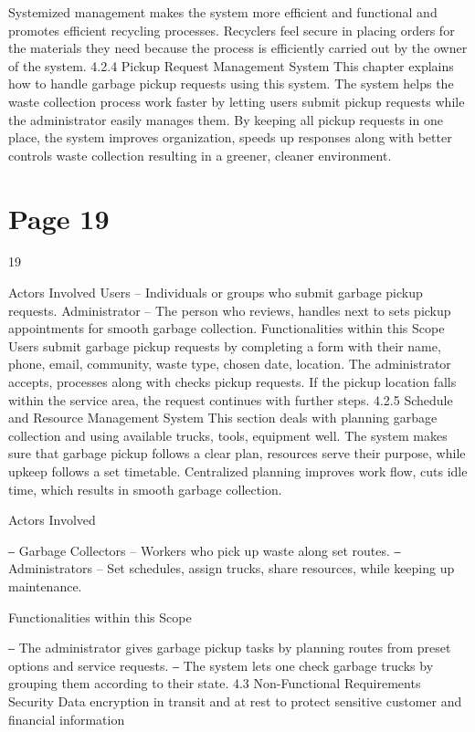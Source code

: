 \documentclass{article}
\begin{document}
Systemized management makes the system more efficient and functional and promotes 
efficient recycling processes. Recyclers feel secure in placing orders for the materials they need 
because the process is efficiently carried out by the owner of the system. 
4.2.4 Pickup Request Management System 
This chapter explains how to handle garbage pickup requests using this system. The system 
helps the waste collection process work faster by letting users submit pickup requests while the 
administrator easily manages them. By keeping all pickup requests in one place, the system 
improves organization, speeds up responses along with better controls waste collection 
resulting in a greener, cleaner environment. 
 

\section*{Page 19}
   
 
 19  
 
Actors Involved 
Users – Individuals or groups who submit garbage pickup requests. 
Administrator – The person who reviews, handles next to sets pickup appointments for smooth 
garbage collection. 
Functionalities within this Scope 
Users submit garbage pickup requests by completing a form with their name, phone, email, 
community, waste type, chosen date, location. 
The administrator accepts, processes along with checks pickup requests. 
If the pickup location falls within the service area, the request continues with further steps. 
4.2.5 Schedule and Resource Management System 
This section deals with planning garbage collection and using available trucks, tools, equipment 
well. The system makes sure that garbage pickup follows a clear plan, resources serve their 
purpose, while upkeep follows a set timetable. Centralized planning improves work flow, cuts 
idle time, which results in smooth garbage collection. 
 
Actors Involved 
 
‒ Garbage Collectors – Workers who pick up waste along set routes. 
‒ Administrators – Set schedules, assign trucks, share resources, while keeping up maintenance. 
 
Functionalities within this Scope 
 
‒ The administrator gives garbage pickup tasks by planning routes from preset options and 
service requests. 
‒ The system lets one check garbage trucks by grouping them according to their state. 
4.3 Non-Functional Requirements 
Security 
 Data encryption in transit and at rest to protect sensitive customer and financial information 
\end{document}
